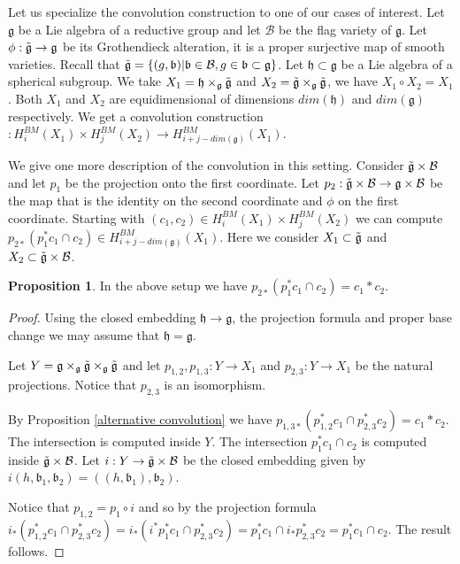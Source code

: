 \documentclass[12pt]{article}
\newcommand{\B}{\mathcal{B}}
\theoremstyle{plain}
\theoremstyle{definition}
\newtheorem{prop}[theorem]{Proposition}
\begin{document}
Let us specialize the convolution construction to one of our cases of interest. Let $\mathfrak{g}$ be a Lie algebra of a reductive group and let $\B$ be the flag variety of $\mathfrak{g}$. Let $\phi:\Tilde{\mathfrak{g}}\rightarrow \mathfrak{g}$ be its Grothendieck alteration, it is a proper surjective map of smooth varieties. Recall that $\Tilde{\mathfrak{g}}=\{(g,\mathfrak{b})|\mathfrak{b}\in\B,g\in \mathfrak{b}\subset \mathfrak{g}\}$. Let $\mathfrak{h}\subset \mathfrak{g}$ be a Lie algebra of a spherical subgroup. We take $X_1=\mathfrak{h}\times_{\mathfrak{g}}\Tilde{\mathfrak{g}}$ and $X_2=\Tilde{\mathfrak{g}}\times_{\mathfrak{g}}\Tilde{\mathfrak{g}}$, we have $X_1\circ X_2=X_1$. Both $X_1$ and $X_2$ are equidimensional of dimensions $dim(\mathfrak{h})$ and $dim(\mathfrak{g})$ respectively. We get a convolution construction $:H_{i}^{BM}(X_1)\times H_{j}^{BM}(X_2)\rightarrow H_{i+j-dim(\mathfrak{g})}^{BM}(X_1)$. 




We give one more description of the convolution in this setting.  Consider $\Tilde{\mathfrak{g}}\times \B$ and let $p_1$ be the projection onto the first coordinate. Let $p_2:\Tilde{\mathfrak{g}}\times \B\rightarrow \mathfrak{g}\times \B$ be the map that is the identity on the second coordinate and $\phi$ on the first coordinate. Starting with $(c_1,c_2)\in H_{i}^{BM}(X_1)\times H_{j}^{BM}(X_2)$ we can compute $p_{2*}(p_1^*c_1\cap c_2)\in H_{i+j-dim(\mathfrak{g})}^{BM}(X_1)$. Here we consider $X_1\subset \Tilde{\mathfrak{g}}$ and $X_2\subset \Tilde{\mathfrak{g}}\times \B$.

\begin{prop}\label{compact description of convolution}
    In the above setup we have $p_{2*}(p_1^*c_1\cap c_2)=c_1*c_2$.
\end{prop}

\begin{proof}

    Using the closed embedding $\mathfrak{h}\rightarrow\mathfrak{g}$, the projection formula and proper base change we may assume that $\mathfrak{h}=\mathfrak{g}$.

    Let $Y=\mathfrak{g}\times_{\mathfrak{g}}\Tilde{\mathfrak{g}}\times_{\mathfrak{g}}\Tilde{\mathfrak{g}}$ and let $p_{1,2},p_{1,3}:Y\rightarrow X_1$ and $p_{2,3}:Y\rightarrow X_1$ be the natural projections. Notice that $p_{2,3}$ is an isomorphism.

    By Proposition \ref{alternative convolution} we have $p_{1,3*}(p_{1,2}^*c_1\cap p^*_{2,3}c_2)=c_1*c_2$. The intersection is computed inside $Y$. The intersection $p_1^*c_1\cap c_2$ is computed inside $\Tilde{\mathfrak{g}}\times \B$. Let $i:Y\rightarrow \Tilde{\mathfrak{g}}\times \B$ be the closed embedding given by $i(h,\mathfrak{b}_1,\mathfrak{b}_2)=((h,\mathfrak{b}_1),\mathfrak{b}_2)$. 

    Notice that $p_{1,2}=p_1\circ i$ and so by the projection formula $i_*(p_{1,2}^*c_1\cap p^*_{2,3}c_2)=i_*(i^*p_{1}^*c_1\cap p^*_{2,3}c_2)=p^*_1c_1\cap i_*p_{2,3}^*c_2=p^*_1c_1\cap c_2$. The result follows.
\end{proof}






\end{document}
